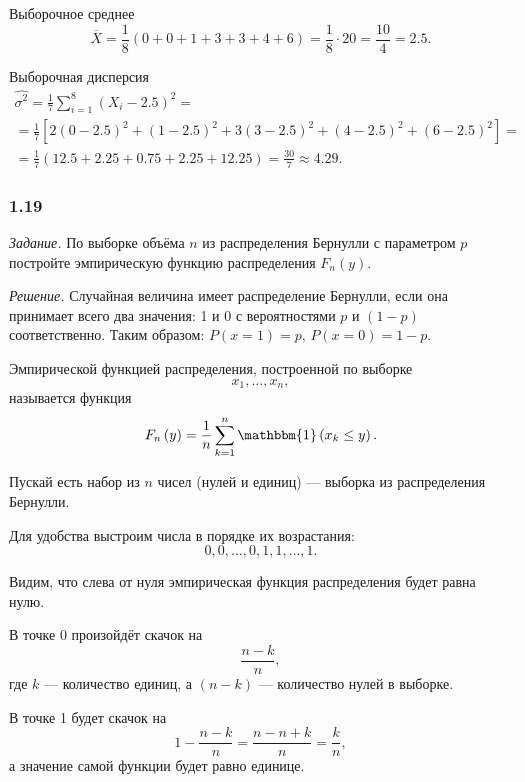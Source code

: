 Выборочное среднее
$$ \overline{X} =
  \frac{1}{8} \left( 0 + 0 + 1 + 3 + 3 + 4 + 6 \right) =
  \frac{1}{8} \cdot 20 =
  \frac{10}{4} =
  2.5.$$

Выборочная дисперсия
\begin{equation*}
\begin{split}
  \hat{ \sigma^2} =
  \frac{1}{7} \sum \limits_{i = 1}^8 \left( X_i - 2.5 \right)^2 = \\
  = \frac{1}{7}
  \left[
    2 \left( 0 - 2.5 \right)^2 +
    \left( 1 - 2.5 \right)^2 +
    3 \left( 3 - 2.5 \right)^2 +
    \left( 4 - 2.5 \right)^2 +
    \left( 6 - 2.5 \right)^2
  \right] = \\
  = \frac{1}{7} \left( 12.5 + 2.25 + 0.75 + 2.25 + 12.25 \right) =
  \frac{30}{7} \approx
  4.29.
\end{split}
\end{equation*}

\subsubsection*{1.19}

\textit{Задание.}
По выборке объёма $n$ из распределения Бернулли с параметром $p$
постройте эмпирическую функцию распределения $F_n \left( y \right) $.

\textit{Решение.}
Случайная величина имеет распределение Бернулли, если она принимает всего два значения:
1 и 0 с вероятностями $p$ и $ \left( 1 - p \right) $ соответственно.
Таким образом: $P \left( x = 1 \right) = p, \, P \left( x = 0 \right) = 1 - p$.

Эмпирической функцией распределения, построенной по выборке
$$x_1, \dotsc, x_n,$$
называется функция
$$F_n \left( y \right) =
  \frac{1}{n} \sum \limits_{k = 1}^n \mathbbm{1} \left( x_k \leq y \right).$$

Пускай есть набор из $n$ чисел (нулей и единиц) --- выборка из распределения Бернулли.

Для удобства выстроим числа в порядке их возрастания:
$$0, 0, \dotsc, 0, 1, 1, \dotsc, 1.$$

Видим, что слева от нуля эмпирическая функция распределения будет равна нулю.

В точке 0 произойдёт скачок на
$$ \frac{n - k}{n},$$
где $k$ --- количество единиц, а $ \left( n - k \right) $ --- количество нулей в выборке.

В точке 1 будет скачок на
$$1 - \frac{n - k}{n} =
  \frac{n - n + k}{n} =
  \frac{k}{n},$$
а значение самой функции будет равно единице.

